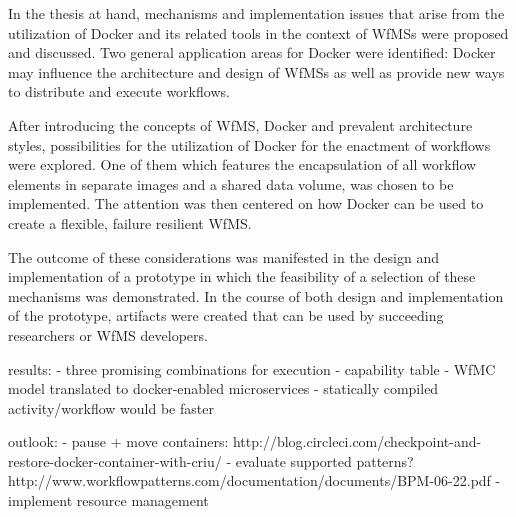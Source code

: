 
In the thesis at hand, mechanisms and implementation issues that arise from the utilization of Docker and its related tools in the context of \acp{WfMS} were proposed and discussed. Two general application areas for Docker were identified: Docker may influence the architecture and design of \acp{WfMS} as well as provide new ways to distribute and execute workflows.

After introducing the concepts of \ac{WfMS}, Docker and prevalent architecture styles, possibilities for the utilization of Docker for the enactment of workflows were explored. One of them which features the encapsulation of all workflow elements in separate images and a shared data volume, was chosen to be implemented. The attention was then centered on how Docker can be used to create a flexible, failure resilient \ac{WfMS}.

The outcome of these considerations was manifested in the design and implementation of a prototype in which the feasibility of a selection of these mechanisms was demonstrated. In the course of both design and implementation of the prototype, artifacts were created that can be used by succeeding researchers or \ac{WfMS} developers.

results:
  - three promising combinations for execution
  - capability table
  - WfMC model translated to docker-enabled microservices
  - statically compiled activity/workflow would be faster

outlook:
  - pause + move containers: http://blog.circleci.com/checkpoint-and-restore-docker-container-with-criu/
  - evaluate supported patterns?  http://www.workflowpatterns.com/documentation/documents/BPM-06-22.pdf
  - implement resource management

